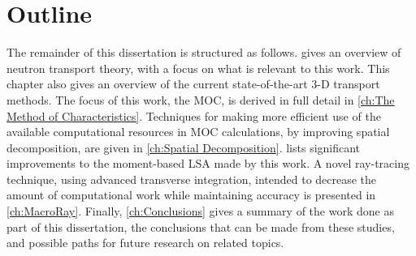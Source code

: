 {    \section{Outline}{\label{sec:Introduction:Outline}
      The remainder of this dissertation is structured as follows.
       gives an overview of neutron transport theory, with a focus on what is relevant to this work.
      This chapter also gives an overview of the current state-of-the-art 3-D transport methods.
      The focus of this work, the \ac{MOC}, is derived in full detail in \cref{ch:The Method of Characteristics}.
      Techniques for making more efficient use of the available computational resources in \ac{MOC} calculations, by improving spatial decomposition, are given in \cref{ch:Spatial Decomposition}.
       lists significant improvements to the moment-based \acf{LSA} made by this work.
      A novel ray-tracing technique, using advanced transverse integration, intended to decrease the amount of computational work while maintaining accuracy is presented in \cref{ch:MacroRay}.
      Finally, \cref{ch:Conclusions} gives a summary of the work done as part of this dissertation, the conclusions that can be made from these studies, and possible paths for future research on related topics.
    }

    \printbibliography
}